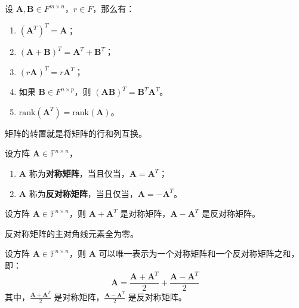 \begin{proposition}[矩阵转置的性质]
    设 $\mathbf{A},\mathbf{B} \in F^{m \times n}$，$r\in F$，那么有：
    \begin{enumerate}
        \item $(\mathbf{A}^T)^T = \mathbf{A}$；
        \item $(\mathbf{A} + \mathbf{B})^T = \mathbf{A}^T + \mathbf{B}^T$；
        \item $(r\mathbf{A})^T = r\mathbf{A}^T$；
        \item 如果 $\mathbf{B} \in F^{n \times p}$，则 $(\mathbf{A}\mathbf{B})^T = \mathbf{B}^T\mathbf{A}^T$。
        \item $\mathrm{rank}(\mathbf{A}^T) = \mathrm{rank}(\mathbf{A})$。
    \end{enumerate}
\end{proposition}

\begin{note}
    矩阵的转置就是将矩阵的行和列互换。
\end{note}

\vspace{1em}

\begin{definition}
    设方阵 $\mathbf{A} \in \mathbb{F}^{n \times n}$，
    \begin{enumerate}
        \item $\mathbf{A}$ 称为\textbf{对称矩阵}，当且仅当，$\mathbf{A} = \mathbf{A}^T$；
        \item $\mathbf{A}$ 称为\textbf{反对称矩阵}，当且仅当，$\mathbf{A} = -\mathbf{A}^T$。
    \end{enumerate}
    \label{def:symmetric_skew_symmetric_matrix}
\end{definition}

\begin{proposition}
    设方阵 $\mathbf{A} \in \mathbb{F}^{n \times n}$，则 $\mathbf{A} + \mathbf{A}^T$ 是对称矩阵，$\mathbf{A} - \mathbf{A}^T$ 是反对称矩阵。
\end{proposition}

\begin{corollary}
    反对称矩阵的主对角线元素全为零。
\end{corollary}

\begin{corollary}
    设方阵 $\mathbf{A} \in \mathbb{F}^{n \times n}$，则 $\mathbf{A}$ 可以唯一表示为一个对称矩阵和一个反对称矩阵之和，即：
    \[
        \mathbf{A} = \frac{\mathbf{A} + \mathbf{A}^T}{2} + \frac{\mathbf{A} - \mathbf{A}^T}{2}
    \]
    其中，$\frac{\mathbf{A} + \mathbf{A}^T}{2}$ 是对称矩阵，$\frac{\mathbf{A} - \mathbf{A}^T}{2}$ 是反对称矩阵。
    \label{prop:symmetric_decomposition}
\end{corollary}

